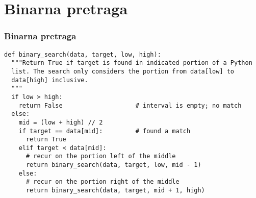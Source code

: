 \documentclass[compress,aspectratio=169]{beamer}
\begin{document}
\section[Binarna pretraga]{Binarna pretraga}
\begin{frame}[fragile,shrink=15]
  \frametitle{Binarna pretraga}
\begin{verbatim}
def binary_search(data, target, low, high):
  """Return True if target is found in indicated portion of a Python 
  list. The search only considers the portion from data[low] to 
  data[high] inclusive.
  """
  if low > high:
    return False                    # interval is empty; no match
  else:
    mid = (low + high) // 2
    if target == data[mid]:         # found a match
      return True
    elif target < data[mid]:
      # recur on the portion left of the middle
      return binary_search(data, target, low, mid - 1)
    else:
      # recur on the portion right of the middle
      return binary_search(data, target, mid + 1, high)
\end{verbatim}  
\end{frame}
\end{document}
